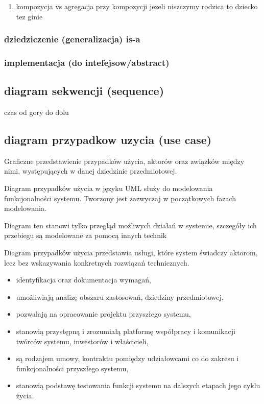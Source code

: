 \documentclass[11pt]{article}
\begin{document}
\begin{enumerate}
\item kompozycja vs agregacja
\label{sec:org11cef1f}
przy kompozycji jezeli niszczymy rodzica to dziecko tez ginie
\end{enumerate}
\subsubsection{dziedziczenie (generalizacja) is-a}
\label{sec:orgdb21658}
\subsubsection{implementacja (do intefejsow/abstract)}
\label{sec:org49e1e56}
\subsection{diagram sekwencji (sequence)}
\label{sec:org685c104}
czas od gory do dolu 
\subsection{diagram przypadkow uzycia (use case)}
\label{sec:org3f99afc}
Graficzne przedstawienie przypadków użycia, aktorów oraz związków między nimi, występujących w danej dziedzinie przedmiotowej.

Diagram przypadków użycia w języku UML służy do modelowania funkcjonalności systemu. Tworzony jest zazwyczaj w początkowych fazach modelowania.

Diagram ten stanowi tylko przegląd możliwych działań w systemie, szczegóły ich przebiegu są modelowane za pomocą innych technik

Diagram przypadków użycia przedstawia usługi, które system świadczy aktorom, lecz bez wskazywania konkretnych rozwiązań technicznych.


\begin{itemize}
\item identyfikacja oraz dokumentacja wymagań,
\item umożliwiają analizę obszaru zastosowań, dziedziny przedmiotowej,
\item pozwalają na opracowanie projektu przyszłego systemu,
\item stanowią przystępną i zrozumiałą platformę współpracy i komunikacji twórców systemu, inwestorów i właścicieli,
\item są rodzajem umowy, kontraktu pomiędzy udziałowcami co do zakresu i funkcjonalności przyszłego systemu,
\item stanowią podstawę testowania funkcji systemu na dalszych etapach jego cyklu życia.
\end{itemize}
\end{document}
